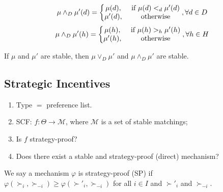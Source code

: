 \documentclass[11pt]{elegantbook}
\begin{document}
\begin{definition}
\begin{enumerate}
\begin{equation}
\begin{aligned}
                \mu \wedge_D \mu'(d)=\left\{\begin{matrix}
                    \mu(d),&\textnormal{ if }\mu(d)<_d\mu'(d)\\
                    \mu'(d),&\textnormal{ otherwise}
                \end{matrix}\right., \forall d\in D
            \end{aligned}
            \nonumber
        \end{equation}
        \begin{equation}
            \begin{aligned}
                \mu \wedge_D \mu'(h)=\left\{\begin{matrix}
                    \mu(h),&\textnormal{ if }\mu(h)>_h\mu'(h)\\
                    \mu'(h),&\textnormal{ otherwise}
                \end{matrix}\right., \forall h\in H
            \end{aligned}
            \nonumber
        \end{equation}
    \end{enumerate}
\end{definition}

\begin{theorem}
    If $\mu$ and $\mu'$ are stable, then $\mu\vee_D\mu'$ and $\mu\wedge_D\mu'$ are stable.
\end{theorem}

\subsection{Strategic Incentives}
\begin{enumerate}[$\circ$]
    \item Type $=$ preference list.
    \item SCF: $f: \Theta \rightarrow \mathcal{M}$, where $\mathcal{M}$ is a set of stable matchings;
    \item Is $f$ strategy-proof?
    \item Does there exist a stable and strategy-proof (direct) mechanism?
\end{enumerate}

\begin{definition}
    \normalfont
    We say a mechanism $\varphi$ is strategy-proof (SP) if $\varphi(\succ_i,\succ_{-i})\geq \varphi (\succ'_i,\succ_{-i})$ for all $i\in I$ and $\succ'_i$ and $\succ_{-i}$.
\end{definition}
\end{document}

